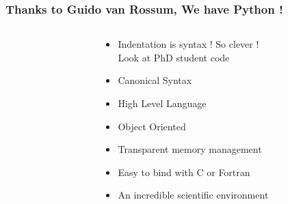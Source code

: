 \begin{frame}
  \frametitle{Thanks to Guido van Rossum, We have Python !}
  \begin{columns}
    \begin{column}{.3\textwidth}
      \begin{center}
      \end{center}
    \end{column}
    \begin{column}{.7\textwidth}
      \begin{itemize}
      \item Indentation is syntax ! So clever ! \\
        {\small Look at PhD student \Cpp{} code}
      \item Canonical Syntax
      \item High Level Language
      \item Object Oriented
      \item Transparent memory management
      \item Easy to bind with C or Fortran
      \item An incredible scientific environment
      \end{itemize}
    \end{column}
  \end{columns}
\end{frame}

